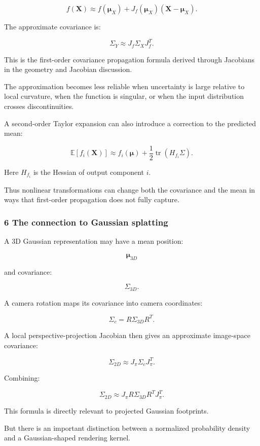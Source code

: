 \[
 f(\mathbf X) \approx f(\boldsymbol\mu_X) + J_f(\boldsymbol\mu_X) (\mathbf X-\boldsymbol\mu_X).
\]

The approximate covariance is:

\[
 \boxed{ \Sigma_Y \approx J_f\Sigma_XJ_f^T }.
\]

This is the first-order covariance propagation formula derived through Jacobians in the geometry and Jacobian discussion.

The approximation becomes less reliable when uncertainty is large relative to local curvature, when the function is singular, or when the input distribution crosses discontinuities.

A second-order Taylor expansion can also introduce a correction to the predicted mean:

\[
 \mathbb E[f_i(\mathbf X)] \approx f_i(\boldsymbol\mu) + \frac12\operatorname{tr}(H_{f_i}\Sigma).
\]

Here \(H_{f_i}\) is the Hessian of output component \(i\).

Thus nonlinear transformations can change both the covariance and the mean in ways that first-order propagation does not fully capture.

\subsubsection{6 The connection to Gaussian splatting}\label{02-foundations-ii-ch024-the-connection-to-gaussian-splatting}

A 3D Gaussian representation may have a mean position:

\[
 \boldsymbol\mu_{3D}
\]

and covariance:

\[
 \Sigma_{3D}.
\]

A camera rotation maps its covariance into camera coordinates:

\[
 \Sigma_c=R\Sigma_{3D}R^T.
\]

A local perspective-projection Jacobian then gives an approximate image-space covariance:

\[
 \boxed{ \Sigma_{2D}\approx J_\pi\Sigma_cJ_\pi^T }.
\]

Combining:

\[
 \boxed{ \Sigma_{2D}\approx J_\pi R\Sigma_{3D}R^TJ_\pi^T }.
\]

This formula is directly relevant to projected Gaussian footprints.

But there is an important distinction between a normalized probability density and a Gaussian-shaped rendering kernel.

